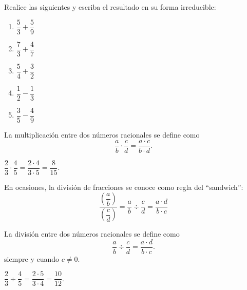 	\begin{problema}
		Realice las siguientes y escriba el resultado en su forma irreducible:
		\begin{enumerate}
			\item $\dfrac{5}{3}+\dfrac{5}{9}$
			\item $\dfrac{7}{3}+\dfrac{4}{7}$
			\item $\dfrac{5}{4}+\dfrac{3}{2}$
			\item $\dfrac{1}{2}-\dfrac{1}{3}$
			\item $\dfrac{3}{5}-\dfrac{4}{9}$
		\end{enumerate}
		
	\end{problema}
	


	
	La multiplicaci\'on entre dos números racionales se define como
	\begin{equation}
		\dfrac{a}{b}\cdot\dfrac{c}{d}=\dfrac{a\cdot c}{b\cdot d}.
	\end{equation}
	
	\begin{problema}
		$\dfrac{2}{3}\cdot \dfrac{4}{5}=\dfrac{2\cdot 4}{3\cdot 5}=\dfrac{8}{15}.$
	\end{problema}
	




	\begin{rem}
		En ocasiones, la divisi\'on de fracciones se conoce como regla del ``sandwich'':
		$$
		\dfrac{\left( \dfrac{a}{b} \right)}{\left( \dfrac{c}{d} \right)}=\dfrac{a}{b}\div \dfrac{c}{d}=\dfrac{a\cdot d}{b \cdot c}
		$$
	\end{rem}
	




	
	La divisi\'on entre dos números racionales se define como
	\begin{equation}
		\dfrac{a}{b}\div\dfrac{c}{d}=\dfrac{a\cdot d}{b\cdot c}.
	\end{equation}
	siempre y cuando $c\neq 0.$
	 
	
	\begin{problema}
		$\dfrac{2}{3}\div \dfrac{4}{5}=\dfrac{2\cdot 5}{3\cdot 4}=\dfrac{10}{12}.$
	\end{problema}
	

